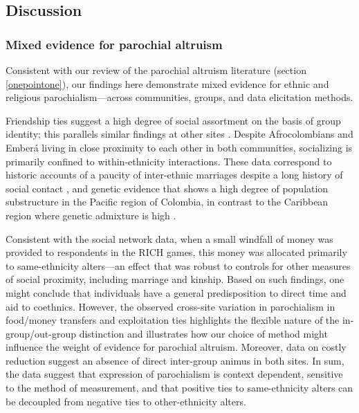 \documentclass[bibauthoryear]{aa}
\begin{document}
\subsection{Discussion}
\subsubsection{Mixed evidence for parochial altruism}

Consistent with our review of the parochial altruism literature (section \ref{onepointone}), our findings here demonstrate mixed evidence for ethnic and religious parochialism---across communities, groups, and data elicitation methods. %

Friendship ties suggest a high degree of social assortment on the basis of group identity; this parallels similar findings at other sites \cite[e.g.,][]{power2017social, baerveldt2007ethnic}. Despite Afrocolombians and Ember\'a living in close proximity to each other in both communities, socializing is primarily confined to within-ethnicity interactions. These data correspond to historic accounts of a paucity of inter-ethnic marriages despite a long history of social contact \citep{Cay73}, and genetic evidence that shows a high degree of population substructure in the Pacific region of Colombia, in contrast to the Caribbean region where genetic admixture is high \citep{ossa2016outlining}.

Consistent with the social network data, when a small windfall of money was provided to respondents in the RICH games, this money was allocated primarily to same-ethnicity alters---an effect that was robust to controls for other measures of social proximity, including marriage and kinship. %
Based on such findings, one might conclude that individuals have a general predisposition to direct time and aid to coethnics.  However, the observed cross-site variation in parochialism in food/money transfers and exploitation ties highlights the flexible nature of the in-group/out-group distinction and illustrates how our choice of method might influence the weight of evidence for parochial altruism. Moreover, data on costly reduction suggest an absence of direct inter-group animus in both sites. In sum, the data suggest that expression of parochialism is context dependent, sensitive to the method of measurement, and that positive ties to same-ethnicity alters can be decoupled from negative ties to other-ethnicity alters.
\end{document}
